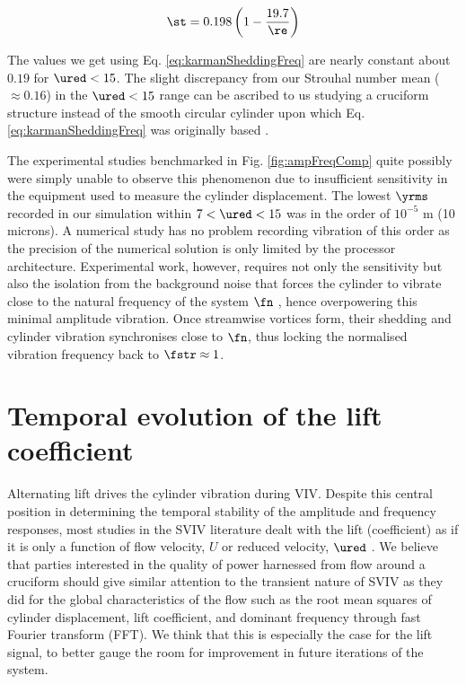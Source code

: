 \documentclass[a4paper,fleqn]{cas-sc}
\begin{document}
\begin{equation}
  \st = 0.198 \left( 1 - \frac{19.7}{\re} \right)
  \label{eq:karmanSheddingFreq}
\end{equation}

The values we get using Eq. \ref{eq:karmanSheddingFreq} are nearly constant about $0.19$ for  $\ured < 15$. The slight discrepancy from our Strouhal number mean ( $\approx 0.16$) in the   $\ured < 15$ range can be ascribed to us studying a cruciform structure instead of the smooth circular cylinder upon which Eq. \ref{eq:karmanSheddingFreq} was originally based \citep{Blevins1990}.

The experimental studies benchmarked in Fig. \ref{fig:ampFreqComp} quite possibly were simply unable to observe this phenomenon due to insufficient sensitivity in the equipment used to measure the cylinder displacement. The lowest  $\yrms$ recorded in our simulation within  $7 < \ured < 15$ was in the order of $10^{-5}$ \si{\metre} (10 microns). A numerical study has no problem recording vibration of this order as the precision of the numerical solution is only limited by the processor architecture. Experimental work, however, requires not only the sensitivity but also the isolation from the background noise that forces the cylinder to vibrate close to the natural frequency of the system  $\fn$ \citep{Nguyen2012}, hence overpowering this minimal amplitude vibration. Once streamwise vortices form, their shedding and cylinder vibration synchronises close to $\fn$, thus locking the normalised vibration frequency back to  $\fstr \approx 1$.


\section{Temporal evolution of the lift coefficient} \label{sec:tempEvo}
Alternating lift drives the cylinder vibration during VIV. Despite this central position in determining the temporal stability of the amplitude and frequency responses, most studies in the SVIV literature dealt with the lift (coefficient) as if it is only a function of flow velocity, $U$ or reduced velocity, $\ured$ \citep{Kawabata2013,Koide2013,Hemsuwan2018b}. We believe that parties interested in the quality of power harnessed from flow around a cruciform should give similar attention to the transient nature of SVIV as they did for the global characteristics of the flow such as the root mean squares of cylinder displacement, lift coefficient, and dominant frequency through fast Fourier transform (FFT). We think that this is especially the case for the lift signal, to better gauge the room for improvement in future iterations of the system.
\end{document}
